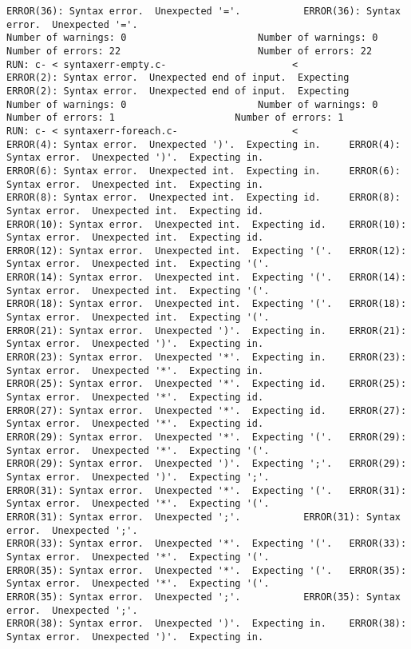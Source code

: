 \documentclass[12pt]{book}
\begin{document}
\begin{lstlisting}
ERROR(36): Syntax error.  Unexpected '='.			ERROR(36): Syntax error.  Unexpected '='.
Number of warnings: 0						Number of warnings: 0
Number of errors: 22						Number of errors: 22
RUN: c- < syntaxerr-empty.c-				      <
ERROR(2): Syntax error.  Unexpected end of input.  Expecting 	ERROR(2): Syntax error.  Unexpected end of input.  Expecting 
Number of warnings: 0						Number of warnings: 0
Number of errors: 1						Number of errors: 1
RUN: c- < syntaxerr-foreach.c-				      <
ERROR(4): Syntax error.  Unexpected ')'.  Expecting in.		ERROR(4): Syntax error.  Unexpected ')'.  Expecting in.
ERROR(6): Syntax error.  Unexpected int.  Expecting in.		ERROR(6): Syntax error.  Unexpected int.  Expecting in.
ERROR(8): Syntax error.  Unexpected int.  Expecting id.		ERROR(8): Syntax error.  Unexpected int.  Expecting id.
ERROR(10): Syntax error.  Unexpected int.  Expecting id.	ERROR(10): Syntax error.  Unexpected int.  Expecting id.
ERROR(12): Syntax error.  Unexpected int.  Expecting '('.	ERROR(12): Syntax error.  Unexpected int.  Expecting '('.
ERROR(14): Syntax error.  Unexpected int.  Expecting '('.	ERROR(14): Syntax error.  Unexpected int.  Expecting '('.
ERROR(18): Syntax error.  Unexpected int.  Expecting '('.	ERROR(18): Syntax error.  Unexpected int.  Expecting '('.
ERROR(21): Syntax error.  Unexpected ')'.  Expecting in.	ERROR(21): Syntax error.  Unexpected ')'.  Expecting in.
ERROR(23): Syntax error.  Unexpected '*'.  Expecting in.	ERROR(23): Syntax error.  Unexpected '*'.  Expecting in.
ERROR(25): Syntax error.  Unexpected '*'.  Expecting id.	ERROR(25): Syntax error.  Unexpected '*'.  Expecting id.
ERROR(27): Syntax error.  Unexpected '*'.  Expecting id.	ERROR(27): Syntax error.  Unexpected '*'.  Expecting id.
ERROR(29): Syntax error.  Unexpected '*'.  Expecting '('.	ERROR(29): Syntax error.  Unexpected '*'.  Expecting '('.
ERROR(29): Syntax error.  Unexpected ')'.  Expecting ';'.	ERROR(29): Syntax error.  Unexpected ')'.  Expecting ';'.
ERROR(31): Syntax error.  Unexpected '*'.  Expecting '('.	ERROR(31): Syntax error.  Unexpected '*'.  Expecting '('.
ERROR(31): Syntax error.  Unexpected ';'.			ERROR(31): Syntax error.  Unexpected ';'.
ERROR(33): Syntax error.  Unexpected '*'.  Expecting '('.	ERROR(33): Syntax error.  Unexpected '*'.  Expecting '('.
ERROR(35): Syntax error.  Unexpected '*'.  Expecting '('.	ERROR(35): Syntax error.  Unexpected '*'.  Expecting '('.
ERROR(35): Syntax error.  Unexpected ';'.			ERROR(35): Syntax error.  Unexpected ';'.
ERROR(38): Syntax error.  Unexpected ')'.  Expecting in.	ERROR(38): Syntax error.  Unexpected ')'.  Expecting in.

\end{lstlisting}
\end{document}
